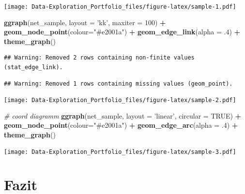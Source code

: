 \documentclass[]{article}
\newenvironment{Shaded}{\begin{snugshade}}{\end{snugshade}}
\newcommand{\CommentTok}[1]{\textcolor[rgb]{0.56,0.35,0.01}{\textit{#1}}}
\newcommand{\DataTypeTok}[1]{\textcolor[rgb]{0.13,0.29,0.53}{#1}}
\newcommand{\DecValTok}[1]{\textcolor[rgb]{0.00,0.00,0.81}{#1}}
\newcommand{\FloatTok}[1]{\textcolor[rgb]{0.00,0.00,0.81}{#1}}
\newcommand{\KeywordTok}[1]{\textcolor[rgb]{0.13,0.29,0.53}{\textbf{#1}}}
\newcommand{\NormalTok}[1]{#1}
\newcommand{\OperatorTok}[1]{\textcolor[rgb]{0.81,0.36,0.00}{\textbf{#1}}}
\newcommand{\OtherTok}[1]{\textcolor[rgb]{0.56,0.35,0.01}{#1}}
\newcommand{\StringTok}[1]{\textcolor[rgb]{0.31,0.60,0.02}{#1}}
\begin{document}
\texttt{[image: Data-Exploration\_Portfolio\_files/figure-latex/sample-1.pdf]}

\begin{Shaded}
\begin{Highlighting}[]
\KeywordTok{ggraph}\NormalTok{(net_sample, }\DataTypeTok{layout =} \StringTok{'kk'}\NormalTok{, }\DataTypeTok{maxiter =} \DecValTok{100}\NormalTok{) }\OperatorTok{+}\StringTok{ }
\StringTok{  }\KeywordTok{geom_node_point}\NormalTok{(}\DataTypeTok{colour=}\StringTok{"#e2001a"}\NormalTok{) }\OperatorTok{+}\StringTok{ }
\StringTok{  }\KeywordTok{geom_edge_link}\NormalTok{(}\DataTypeTok{alpha =} \FloatTok{.4}\NormalTok{) }\OperatorTok{+}
\StringTok{  }\KeywordTok{theme_graph}\NormalTok{()}
\end{Highlighting}
\end{Shaded}

\begin{verbatim}
## Warning: Removed 2 rows containing non-finite values (stat_edge_link).
\end{verbatim}

\begin{verbatim}
## Warning: Removed 1 rows containing missing values (geom_point).
\end{verbatim}

\texttt{[image: Data-Exploration\_Portfolio\_files/figure-latex/sample-2.pdf]}

\begin{Shaded}
\begin{Highlighting}[]
\CommentTok{# coord diagramm}
\KeywordTok{ggraph}\NormalTok{(net_sample, }\DataTypeTok{layout =} \StringTok{'linear'}\NormalTok{, }\DataTypeTok{circular =} \OtherTok{TRUE}\NormalTok{) }\OperatorTok{+}\StringTok{ }
\StringTok{  }\KeywordTok{geom_node_point}\NormalTok{(}\DataTypeTok{colour=}\StringTok{"#e2001a"}\NormalTok{) }\OperatorTok{+}
\StringTok{  }\KeywordTok{geom_edge_arc}\NormalTok{(}\DataTypeTok{alpha =} \FloatTok{.4}\NormalTok{) }\OperatorTok{+}
\StringTok{  }\KeywordTok{theme_graph}\NormalTok{()}
\end{Highlighting}
\end{Shaded}

\texttt{[image: Data-Exploration\_Portfolio\_files/figure-latex/sample-3.pdf]}

\hypertarget{fazit}{%
\section{Fazit}\label{fazit}}
\end{document}
